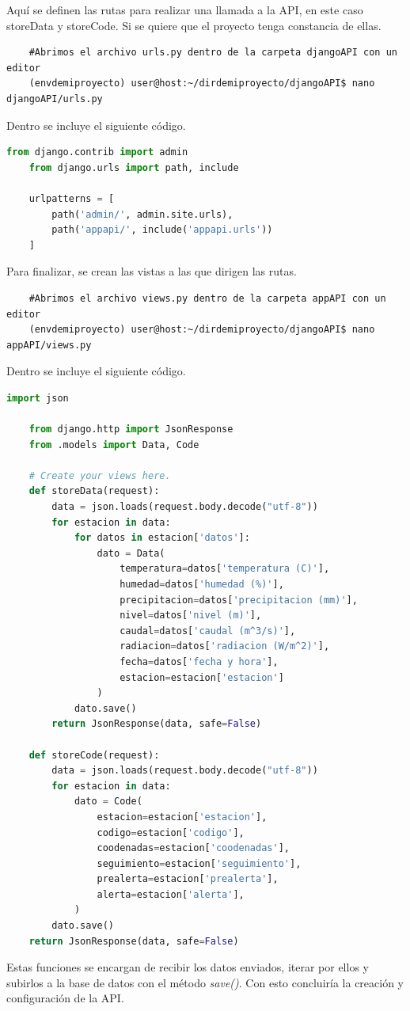 Aquí se definen las rutas para realizar una llamada a la API, en este caso storeData y storeCode.\newline
\newline
Si se quiere que el proyecto tenga constancia de ellas.

\begin{lstlisting}
	#Abrimos el archivo urls.py dentro de la carpeta djangoAPI con un editor
	(envdemiproyecto) user@host:~/dirdemiproyecto/djangoAPI$ nano djangoAPI/urls.py
\end{lstlisting}

Dentro se incluye el siguiente código.

\begin{lstlisting}[language=Python, caption={Configuración URLs API}]
	from django.contrib import admin
	from django.urls import path, include
	
	urlpatterns = [
		path('admin/', admin.site.urls),
		path('appapi/', include('appapi.urls'))
	]
\end{lstlisting}

Para finalizar, se crean las vistas a las que dirigen las rutas.

\begin{lstlisting}
	#Abrimos el archivo views.py dentro de la carpeta appAPI con un editor
	(envdemiproyecto) user@host:~/dirdemiproyecto/djangoAPI$ nano appAPI/views.py
\end{lstlisting}

Dentro se incluye el siguiente código.

\begin{lstlisting}[language=Python, caption={Definición funciones de recepción y almacenamiento de datos API}]
	import json
	
	from django.http import JsonResponse
	from .models import Data, Code
	
	# Create your views here.
	def storeData(request):
		data = json.loads(request.body.decode("utf-8"))
		for estacion in data:
			for datos in estacion['datos']:
				dato = Data(
					temperatura=datos['temperatura (C)'],
					humedad=datos['humedad (%)'],
					precipitacion=datos['precipitacion (mm)'],
					nivel=datos['nivel (m)'],
					caudal=datos['caudal (m^3/s)'],
					radiacion=datos['radiacion (W/m^2)'],
					fecha=datos['fecha y hora'],
					estacion=estacion['estacion']
				)
			dato.save()
		return JsonResponse(data, safe=False)
	
	def storeCode(request):
		data = json.loads(request.body.decode("utf-8"))
		for estacion in data:
			dato = Code(
				estacion=estacion['estacion'],
				codigo=estacion['codigo'],
				coodenadas=estacion['coodenadas'],
				seguimiento=estacion['seguimiento'],
				prealerta=estacion['prealerta'],
				alerta=estacion['alerta'],
			)
		dato.save()
	return JsonResponse(data, safe=False)
\end{lstlisting}

Estas funciones se encargan de recibir los datos enviados, iterar por ellos y subirlos a la base de datos con el método \textit{save()}.\newline
\newline
Con esto concluiría la creación y configuración de la API.

